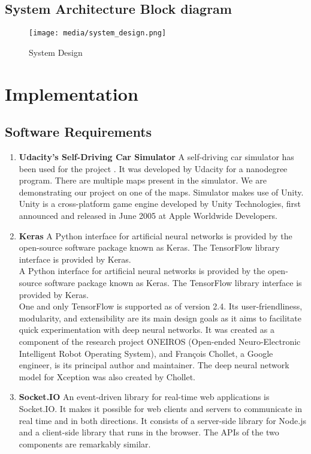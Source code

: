 \documentclass[ 12pt,a4paper,twocolumn,fleqn]{article}
\begin{document}
\subsection{System Architecture Block diagram}
\begin{figure}[H]
\texttt{[image: media/system\_design.png]}
\centering
\caption{System Design}
\end{figure}
\newpage
\section{Implementation}
\subsection{Software Requirements}
\begin{enumerate}
    \item \textbf{Udacity's Self-Driving Car Simulator}
    A self-driving car simulator has been used for the project .  It was developed by Udacity for a nanodegree program. There are multiple maps present in the simulator. We are demonstrating our project on one of the maps. Simulator makes use of Unity.\\
    Unity is a cross-platform game engine developed by Unity Technologies, first announced and released in June 2005 at Apple Worldwide Developers. 
    \item \textbf{Keras} 
    A Python interface for artificial neural networks is provided by the open-source software package known as Keras. The TensorFlow library interface is provided by Keras.\\
    A Python interface for artificial neural networks is provided by the open-source software package known as Keras. The TensorFlow library interface is provided by Keras.\\
    One and only TensorFlow is supported as of version 2.4. Its user-friendliness, modularity, and extensibility are its main design goals as it aims to facilitate quick experimentation with deep neural networks. It was created as a component of the research project ONEIROS (Open-ended Neuro-Electronic Intelligent Robot Operating System), and François Chollet, a Google engineer, is its principal author and maintainer. The deep neural network model for Xception was also created by Chollet.
    \item \textbf{Socket.IO}
    An event-driven library for real-time web applications is Socket.IO. It makes it possible for web clients and servers to communicate in real time and in both directions. It consists of a server-side library for Node.js and a client-side library that runs in the browser. The APIs of the two components are remarkably similar.\\

\end{enumerate}
\end{document}
